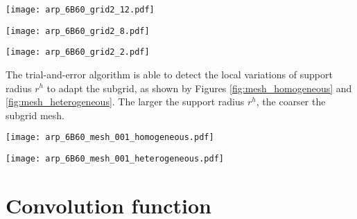 \documentclass[12pt]{scrartcl}
\begin{document}
\begin{center}
\texttt{[image: arp\_6B60\_grid2\_12.pdf]}
\end{center}
\begin{center}
\texttt{[image: arp\_6B60\_grid2\_8.pdf]}
\end{center}
\begin{center}
\texttt{[image: arp\_6B60\_grid2\_2.pdf]}
\end{center}

The trial-and-error algorithm is able to detect the local variations of support radius $r^h$ to adapt the subgrid, as shown by Figures \ref{fig:mesh_homogeneous} and \ref{fig:mesh_heterogeneous}. The larger the support radius $r^h$, the coarser the subgrid mesh.

\begin{center}
\texttt{[image: arp\_6B60\_mesh\_001\_homogeneous.pdf]}
\end{center}
\begin{center}
\texttt{[image: arp\_6B60\_mesh\_001\_heterogeneous.pdf]}
\end{center}

\section{Convolution function}
\end{document}
